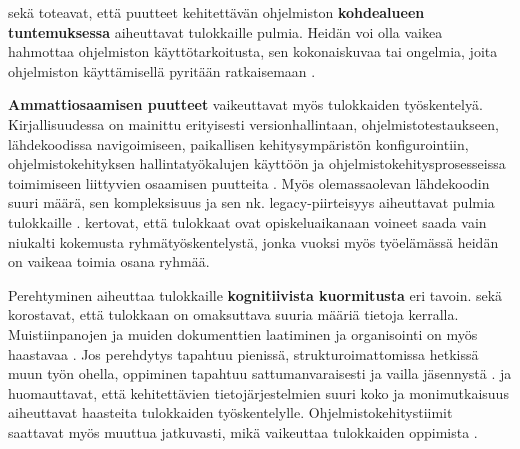 \documentclass[utf8]{gradu3}
\begin{document}
\textcite{matturro-ym-2017} sekä \textcite{dagenais-ym-2010} toteavat, että puutteet kehitettävän ohjelmiston \textbf{kohdealueen tuntemuksessa} aiheuttavat tulokkaille pulmia. Heidän voi olla vaikea hahmottaa ohjelmiston käyttötarkoitusta, sen kokonaiskuvaa tai ongelmia, joita ohjelmiston käyttämisellä pyritään ratkaisemaan \parencite{matturro-ym-2017}.

\textbf{Ammattiosaamisen puutteet} vaikeuttavat myös tulokkaiden työskentelyä. Kirjallisuudessa
on mainittu erityisesti versionhallintaan, ohjelmistotestaukseen, lähdekoodissa navigoimiseen, paikallisen kehitysympäristön konfigurointiin, ohjelmistokehityksen hallintatyökalujen käyttöön ja ohjelmistokehitysprosesseissa toimimiseen liittyvien osaamisen puutteita  %
\parencites%
    {craig-ym-2018}%
    {matturro-ym-2017}%
    {dagenais-ym-2010}%
    {begel-simon-2008}%
\relax
% 
. Myös olemassaolevan lähdekoodin suuri määrä, sen kompleksisuus ja sen nk. legacy-piirteisyys aiheuttavat pulmia tulokkaille %
\parencites%
    {britto-ym-2019}%
    {viviani-murphy-2019}%
    {craig-ym-2018}
    {begel-simon-2008}%
\relax.
\textcite{craig-ym-2018} kertovat, että tulokkaat ovat opiskeluaikanaan voineet saada vain niukalti kokemusta ryhmätyöskentelystä, jonka vuoksi myös työelämässä heidän on vaikeaa toimia osana ryhmää.

Perehtyminen aiheuttaa tulokkaille \textbf{kognitiivista kuormitusta} eri tavoin. \textcite{dagenais-ym-2010} sekä \textcite{begel-simon-2008} korostavat, että tulokkaan on omaksuttava suuria määriä tietoja kerralla. Muistiinpanojen ja muiden dokumenttien laatiminen ja organisointi on myös haastavaa \parencite{radermacher-ym-2015}. Jos perehdytys tapahtuu pienissä, strukturoimattomissa hetkissä muun työn ohella, oppiminen tapahtuu sattumanvaraisesti ja vailla jäsennystä \parencite{begel-simon-2008}. \textcite{craig-ym-2018} ja \textcite{britto-ym-2019} huomauttavat, että kehitettävien tietojärjestelmien suuri koko ja monimutkaisuus aiheuttavat haasteita tulokkaiden työskentelylle. Ohjelmistokehitystiimit saattavat myös muuttua jatkuvasti, mikä vaikeuttaa tulokkaiden oppimista \parencite{britto-ym-2019}.
\end{document}
